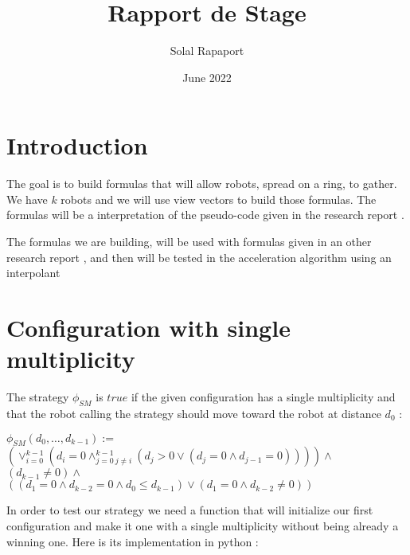 \documentclass{article}
\title{Rapport de Stage}
\author{Solal Rapaport }
\date{June 2022}
\begin{document}
\maketitle

\section{Introduction}

The goal is to build formulas that will allow robots, spread on a ring, to gather. We have $k$ robots and we will use view vectors to build those formulas. The formulas will be a interpretation of the pseudo-code given in the research report \cite{gathering}.

The formulas we are building, will be used with formulas given in an other research report \cite{algo}, and then will be tested in the acceleration algorithm using an interpolant \cite{algo}

\section{Configuration with single multiplicity}

The strategy $\phi_{SM}$ is $true$ if the given configuration has a single multiplicity and that the robot calling the strategy should move toward the robot at distance $d_{0}$ :
\begin{center}
$\phi_{SM}(d_0, \ldots , d_{k-1}):=$\\
$(\lor_{i=0}^{k-1}(d_i = 0\land_{j=0\ j\not=i}^{k-1} (d_j > 0 \lor (d_j = 0 \land d_{j-1} = 0) ) ))\land$\\
$(d_{k-1} \not= 0) \land $\\
$((d_1 = 0 \land d_{k-2} = 0 \land d_0 \leq d_{k-1}) \lor (d_1 = 0 \land d_{k-2} \not= 0))$
\end{center}

In order to test our strategy we need a function that will initialize our first configuration and make it one with a single multiplicity without being already a winning one. Here is its implementation in python :
\end{document}
